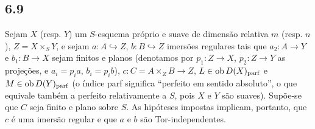 \subsection*{6.9}

Sejam $X$ (resp. $Y$) um $S$-esquema próprio e suave de dimensão relativa $m$ (resp. $n$), $Z=X\times_S Y$, e sejam $a:A\hookrightarrow Z$, $b:B\hookrightarrow Z$ imersões regulares tais que $a_2:A\to Y$ e $b_1:B\to X$ sejam finitos e planos (denotamos por $p_1:Z\to X$, $p_2:Z\to Y$ as projeções, e $a_i=p_i a$, $b_i=p_i b$), $c:C=A\times_Z B\to Z$, $L\in\operatorname{ob} D(X)_{\mathrm{parf}}$ e $M\in\operatorname{ob} D(Y)_{\mathrm{parf}}$ (o índice parf significa ``perfeito em sentido absoluto'', o que equivale também a perfeito relativamente a $S$, pois $X$ e $Y$ são suaves). Supõe-se que $C$ seja finito e plano sobre $S$. As hipóteses impostas implicam, portanto, que $c$ é uma imersão regular e que $a$ e $b$ são Tor-independentes.

